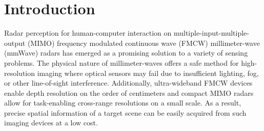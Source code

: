 \documentclass[10pt,journal,final]{IEEEtran}
\begin{document}
\section{Introduction}
\label{sec:introduction}
Radar perception for human-computer interaction on multiple-input-multiple-output (MIMO) frequency modulated continuous wave (FMCW) millimeter-wave (mmWave) radars has emerged as a promising solution to a variety of sensing problems. The physical nature of millimeter-waves offers a safe method for high-resolution imaging where optical sensors may fail due to insufficient lighting, fog, or other line-of-sight interference. Additionally, ultra-wideband FMCW devices enable depth resolution on the order of centimeters and compact MIMO radars allow for task-enabling cross-range resolutions on a small scale. As a result, precise spatial information of a target scene can be easily acquired from such imaging devices at a low cost.
\end{document}
